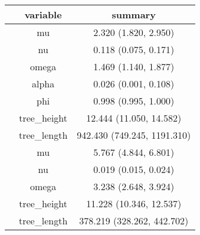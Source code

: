 \begingroup
\fontsize{5.2pt}{6.3pt}\selectfont
\begin{longtable}{l|cc}
\toprule
 & variable & summary \\ 
\midrule\addlinespace[2.5pt]
\multirow{7}{=}{Extended Beta} & mu & 2.320 (1.820, 2.950) \\ 
 & nu & 0.118 (0.075, 0.171) \\ 
 & omega & 1.469 (1.140, 1.877) \\ 
 & alpha & 0.026 (0.001, 0.108) \\ 
 & phi & 0.998 (0.995, 1.000) \\ 
 & tree\_height & 12.444 (11.050, 14.582) \\ 
 & tree\_length & 942.430 (749.245, 1191.310) \\ 
\midrule\addlinespace[2.5pt]
\multirow{5}{=}{Kingman} & mu & 5.767 (4.844, 6.801) \\ 
 & nu & 0.019 (0.015, 0.024) \\ 
 & omega & 3.238 (2.648, 3.924) \\ 
 & tree\_height & 11.228 (10.346, 12.537) \\ 
 & tree\_length & 378.219 (328.262, 442.702) \\ 
\bottomrule
\end{longtable}
\endgroup

